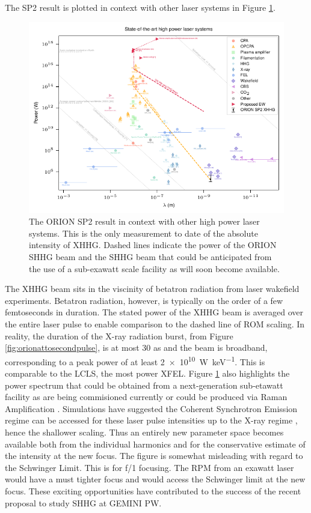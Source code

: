 The SP2 result is plotted in context with other laser systems in Figure \ref{fig:lasersystems}.
\begin{figure}
	\centering
	\includegraphics{figures/intro/laser_systems}
	\caption[The ORION result in context.]{The ORION SP2 result in context with other high power laser systems. This is the only measurement to date of the absolute intensity of XHHG. Dashed lines indicate the power of the ORION SHHG beam and the SHHG beam that could be anticipated from the use of a sub-exawatt scale facility as will soon become available.}
	\label{fig:lasersystems}
\end{figure}
The XHHG beam sits in the viscinity of betatron radiation from laser wakefield experiments. Betatron radiation, however, is typically on the order of a few femtoseconds in duration. The stated power of the XHHG beam is averaged over the entire laser pulse to enable comparison to the dashed line of ROM scaling. In reality, the duration of the X-ray radiation burst, from Figure \ref{fig:orionattosecondpulse}, is at most 30 as and the beam is broadband, corresponding to a peak power of at least \qty{2e10}{W.keV^{-1}}. This is comparable to the LCLS, the most power XFEL.
Figure \ref{fig:lasersystems} also highlights the power spectrum that could be obtained from a next-generation sub-etawatt facility as are being commisioned currently or could be produced via Raman Amplification \cite{trinesSimulationsEfficientRaman2011}. Simulations have suggested the Coherent Synchrotron Emission regime can be accessed for these laser pulse intensities up to the X-ray regime \cite{edwardsXRayEmissionEffectiveness2020}, hence the shallower scaling. Thus an entirely new parameter space becomes available both from the individual harmonics and for the conservative estimate of the intensity at the new focus. The figure is somewhat misleading with regard to the Schwinger Limit. This is for f/1 focusing. The RPM from an exawatt laser would have a must tighter focus and would access the Schwinger limit at the new focus. These exciting opportunities have contributed to the success of the recent proposal to study SHHG at GEMINI PW.

